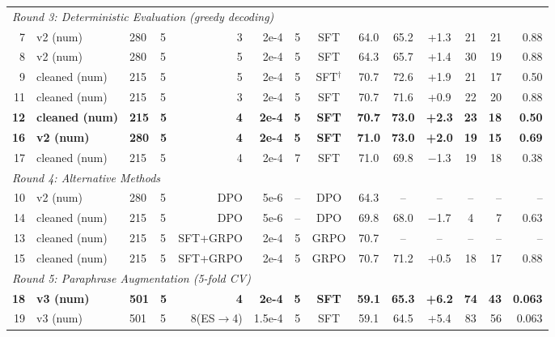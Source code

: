\begin{table}[t]
{\begin{tabular}{rlllrrccccccrr}
\midrule
\multicolumn{14}{l}{\textit{Round 3: Deterministic Evaluation (greedy decoding)}} \\
7   & v2 (num)         & 280 & 5  & 3        & 2e-4   & 5   & SFT    & 64.0 & 65.2 & +1.3  & 21  & 21 & 0.88  \\
8   & v2 (num)         & 280 & 5  & 5        & 2e-4   & 5   & SFT    & 64.3 & 65.7 & +1.4  & 30  & 19 & 0.88  \\
9   & cleaned (num)    & 215 & 5  & 5        & 2e-4   & 5   & SFT$^\dagger$  & 70.7 & 72.6 & +1.9  & 21  & 17 & 0.50  \\
11  & cleaned (num)    & 215 & 5  & 3        & 2e-4   & 5   & SFT    & 70.7 & 71.6 & +0.9  & 22  & 20 & 0.88  \\
\textbf{12} & \textbf{cleaned (num)} & \textbf{215} & \textbf{5} & \textbf{4} & \textbf{2e-4} & \textbf{5} & \textbf{SFT} & \textbf{70.7} & \textbf{73.0} & \textbf{+2.3} & \textbf{23} & \textbf{18} & \textbf{0.50} \\
\textbf{16} & \textbf{v2 (num)} & \textbf{280} & \textbf{5} & \textbf{4} & \textbf{2e-4} & \textbf{5} & \textbf{SFT} & \textbf{71.0} & \textbf{73.0} & \textbf{+2.0} & \textbf{19} & \textbf{15} & \textbf{0.69} \\
17  & cleaned (num)    & 215 & 5  & 4        & 2e-4   & 7   & SFT    & 71.0 & 69.8 & $-$1.3 & 19  & 18 & 0.38  \\
\midrule
\multicolumn{14}{l}{\textit{Round 4: Alternative Methods}} \\
10  & v2 (num)         & 280 & 5  & DPO      & 5e-6   & --  & DPO    & 64.3 & --   & --    & --  & -- & --    \\
14  & cleaned (num)    & 215 & 5  & DPO      & 5e-6   & --  & DPO    & 69.8 & 68.0 & $-$1.7 & 4   & 7  & 0.63  \\
13  & cleaned (num)    & 215 & 5  & SFT+GRPO & 2e-4   & 5   & GRPO   & 70.7 & --   & --    & --  & -- & --    \\
15  & cleaned (num)    & 215 & 5  & SFT+GRPO & 2e-4   & 5   & GRPO   & 70.7 & 71.2 & +0.5  & 18  & 17 & 0.88  \\
\midrule
\multicolumn{14}{l}{\textit{Round 5: Paraphrase Augmentation (5-fold CV)}} \\
\textbf{18} & \textbf{v3 (num)} & \textbf{501} & \textbf{5} & \textbf{4} & \textbf{2e-4} & \textbf{5} & \textbf{SFT} & \textbf{59.1} & \textbf{65.3} & \textbf{+6.2} & \textbf{74} & \textbf{43} & \textbf{0.063} \\
19  & v3 (num)         & 501 & 5  & 8(ES$\to$4) & 1.5e-4 & 5 & SFT  & 59.1 & 64.5 & +5.4  & 83  & 56 & 0.063 \\

\end{tabular}}
\end{table}
